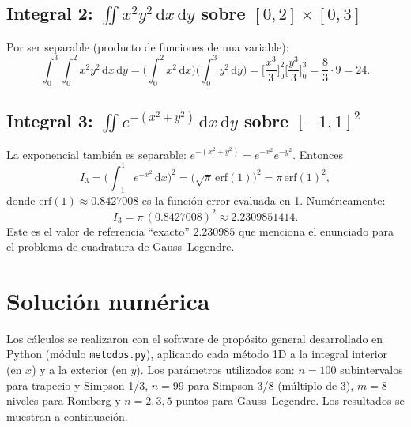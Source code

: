 \documentclass[12pt,a4paper]{article}
\newcommand{\dd}{\,\mathrm{d}}
\begin{document}
\subsection{Integral 2: $\iint x^2 y^2\dd x\dd y$ sobre $[0,2]\times[0,3]$}
Por ser separable (producto de funciones de una variable):
\[
  \int_{0}^{3}\!\int_{0}^{2}x^2y^2\dd x\dd y
  =\Big(\int_{0}^{2}x^2\dd x\Big)\Big(\int_{0}^{3}y^2\dd y\Big)
  =\Big[\frac{x^3}{3}\Big]_{0}^{2}\Big[\frac{y^3}{3}\Big]_{0}^{3}
  =\frac{8}{3}\cdot 9 = 24 .
\]

\subsection{Integral 3: $\iint e^{-(x^2+y^2)}\dd x\dd y$ sobre $[-1,1]^2$}
La exponencial también es separable: $e^{-(x^2+y^2)}=e^{-x^2}e^{-y^2}$. Entonces
\[
  I_3=\Big(\int_{-1}^{1}e^{-x^2}\dd x\Big)^{2}
  =\Big(\sqrt{\pi}\,\mathrm{erf}(1)\Big)^{2}
  =\pi\,\mathrm{erf}(1)^2 ,
\]
donde $\mathrm{erf}(1)\approx 0.8427008$ es la función error evaluada en 1.
Numéricamente:
\[
  I_3 = \pi\,(0.8427008)^2 \approx 2.2309851414 .
\]
Este es el valor de referencia ``exacto'' $2.230985$ que menciona el enunciado
para el problema de cuadratura de Gauss--Legendre.
\section{Solución numérica}
Los cálculos se realizaron con el software de propósito general desarrollado en
Python (módulo \texttt{metodos.py}), aplicando cada método 1D a la integral
interior (en $x$) y a la exterior (en $y$). Los parámetros utilizados son:
$n=100$ subintervalos para trapecio y Simpson 1/3, $n=99$ para Simpson 3/8
(múltiplo de 3), $m=8$ niveles para Romberg y $n=2,3,5$ puntos para
Gauss--Legendre. Los resultados se muestran a continuación.
\end{document}
